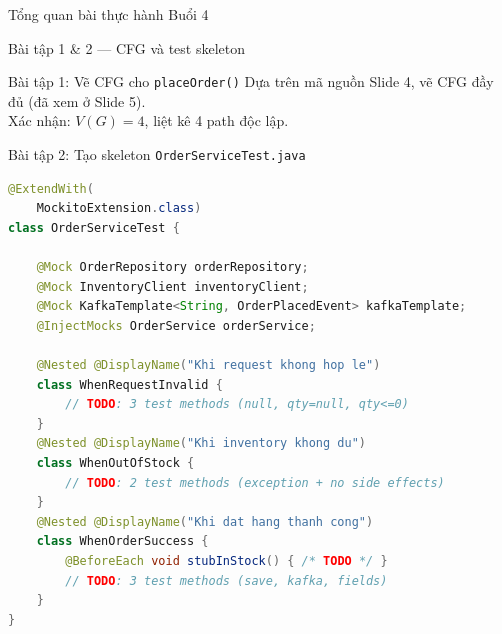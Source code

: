 \documentclass[aspectratio=169,10pt]{beamer}
\begin{document}
\begin{frame}[shrink=10]{Tổng quan bài thực hành Buổi 4}
  \centering
  \tiny
\end{frame}

\begin{frame}[fragile,shrink=36]{Bài tập 1 \& 2 --- CFG và test skeleton}
  \begin{block}{Bài tập 1: Vẽ CFG cho \texttt{placeOrder()}}
    Dựa trên mã nguồn Slide 4, vẽ CFG đầy đủ (đã xem ở Slide 5).\\
    Xác nhận: $V(G) = 4$, liệt kê 4 path độc lập.
  \end{block}

  \begin{block}{Bài tập 2: Tạo skeleton \texttt{OrderServiceTest.java}}
\begin{lstlisting}[language=java]
@ExtendWith(
    MockitoExtension.class)
class OrderServiceTest {

    @Mock OrderRepository orderRepository;
    @Mock InventoryClient inventoryClient;
    @Mock KafkaTemplate<String, OrderPlacedEvent> kafkaTemplate;
    @InjectMocks OrderService orderService;

    @Nested @DisplayName("Khi request khong hop le")
    class WhenRequestInvalid {
        // TODO: 3 test methods (null, qty=null, qty<=0)
    }
    @Nested @DisplayName("Khi inventory khong du")
    class WhenOutOfStock {
        // TODO: 2 test methods (exception + no side effects)
    }
    @Nested @DisplayName("Khi dat hang thanh cong")
    class WhenOrderSuccess {
        @BeforeEach void stubInStock() { /* TODO */ }
        // TODO: 3 test methods (save, kafka, fields)
    }
}
\end{lstlisting}
  \end{block}
\end{frame}
\end{document}
